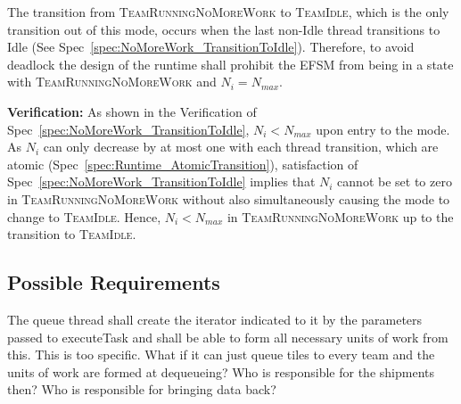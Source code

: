 \documentclass{article}
\newcommand{\TeamIdle}          {\textsc{TeamIdle}}
\newcommand{\TeamRunningNoMoreWork} {\textsc{TeamRunningNoMoreWork}}
\begin{document}
\begin{spec}
\label{spec:NoMoreWork_NeedThread}
The transition from {\TeamRunningNoMoreWork} to \TeamIdle, which is the only
transition out of this mode, occurs when the last non-Idle thread transitions to
Idle (See Spec~\ref{spec:NoMoreWork_TransitionToIdle}).  Therefore, to avoid
deadlock the design of the runtime shall prohibit the EFSM from being in a state
with {\TeamRunningNoMoreWork} and $N_i = N_{max}$.
\end{spec}
\textbf{Verification:}\hspace{0.125in} As shown in the Verification of
Spec~\ref{spec:NoMoreWork_TransitionToIdle},  $N_i < N_{max}$ upon entry to the
mode.  As $N_i$ can only decrease by at most one with each thread transition,
which are atomic (Spec~\ref{spec:Runtime_AtomicTransition}), satisfaction of
Spec~\ref{spec:NoMoreWork_TransitionToIdle} implies that $N_i$ cannot be set to
zero in {\TeamRunningNoMoreWork} without also simultaneously causing the mode to
change to \TeamIdle.  Hence, $N_i < N_{max}$ in {\TeamRunningNoMoreWork} up to
the transition to \TeamIdle.

\subsection{Possible Requirements}


The queue thread shall create the iterator indicated to it by the parameters
passed to executeTask and shall be able to form all necessary units of work from
this.  This is too specific.  What if it can just queue tiles to every team and
the units of work are formed at dequeueing?  Who is responsible for the
shipments then?  Who is responsible for bringing data back?

\end{document}
